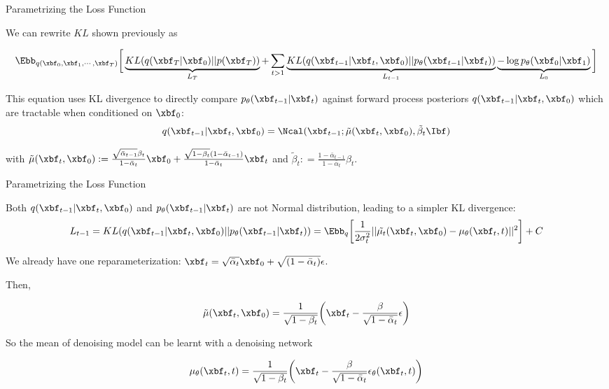 \documentclass[aspectratio=169,xcolor=dvipsnames,svgnames,x11names,fleqn]{beamer}
\begin{document}
    \begin{frame}{Parametrizing the Loss Function}
    
    We can rewrite $KL$ shown previously as 
    
    \begin{align*}
    \Ebb_{q(\xbf_0,\xbf_1, \cdots,\xbf_T)}\bigg[\underbrace{KL( q(\xbf_T | \xbf_0) || p(\xbf_T) )}_{L_T} + \sum_{t > 1} \underbrace{KL( q(\xbf_{t-1} | \xbf_t, \xbf_0) || p_\theta(\xbf_{t-1} | \xbf_t))}_{L_{t-1}} \underbrace{- \log p_\theta(\xbf_0 | \xbf_1)}_{L_0} \bigg]
    \end{align*}
    
    This equation uses KL divergence to directly compare $p_\theta(\xbf_{t-1} | \xbf_t)$ against forward process posteriors $q(\xbf_{t-1} | \xbf_t, \xbf_0)$ which are tractable when conditioned on $\xbf_0$:
    \begin{align*}
    q(\xbf_{t-1} | \xbf_t, \xbf_0)  = \Ncal(\xbf_{t-1}; \tilde{\mu}(\xbf_t, \xbf_0), \tilde{\beta}_t \Ibf)
    \end{align*}
    
    with $\tilde{\mu}(\xbf_t, \xbf_0):= \frac{\sqrt{\bar{\alpha}_{t-1}}\beta_t}{1- \bar{\alpha}_t}\xbf_0 + \frac{\sqrt{1 - \beta_t}(1  - \bar{\alpha}_{t-1})}{1 - \bar{\alpha}_t}\xbf_t$ and $\tilde{\beta}_t : = \frac{1- \bar{\alpha}_{t-1}}{1- \bar{\alpha}_t}\beta_t$.
    
    \end{frame}
    
        \begin{frame}{Parametrizing the Loss Function}
        
        \footnotesize

Both $q(\xbf_{t-1} | \xbf_t, \xbf_0)$ and $p_\theta(\xbf_{t-1}| \xbf_t)$ are not Normal distribution, leading to a simpler KL divergence:
\begin{align*}
L_{t-1} = KL( q(\xbf_{t-1} | \xbf_t, \xbf_0) || p_\theta(\xbf_{t-1}| \xbf_t)) = \Ebb_q \bigg [ \frac{1}{2\sigma^2_t} || \tilde{\mu_t}(\xbf_t, \xbf_0) - \mu_\theta (\xbf_t, t) || ^2 \bigg] + C
\end{align*}

We already have one reparameterization: $\xbf_t = \sqrt{\bar{\alpha}_t}\xbf_0 + \sqrt{(1-\bar{\alpha}_t)}\epsilon$.

Then,

\begin{align*}
\tilde{\mu}(\xbf_t, \xbf_0) = \frac{1}{\sqrt{1 - \beta_t}} \bigg( \xbf_t - \frac{\beta}{\sqrt{1 - \bar{\alpha}_t}}\epsilon \bigg)
\end{align*}

So the mean of denoising model can be learnt with a denoising network 

\begin{align*}
\mu_\theta(\xbf_t, t) = \frac{1}{\sqrt{1 - \beta_t}} \bigg( \xbf_t - \frac{\beta}{\sqrt{1 - \bar{\alpha}_t}} \epsilon_\theta(\xbf_t, t) \bigg)
\end{align*}
        
        \end{frame}
\end{document}
